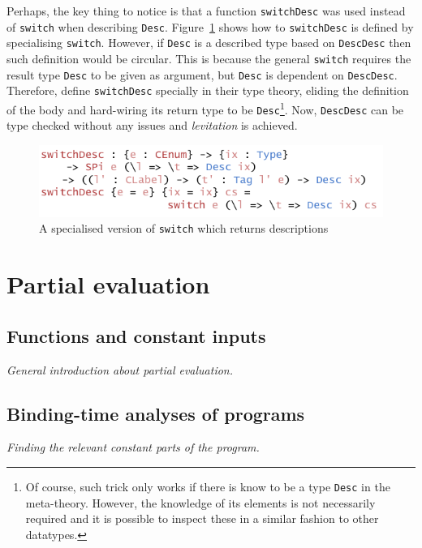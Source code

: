 \documentclass{ituthesis}
\newcommand{\tttype}[1]{\textcolor{type-color}{\texttt{#1}}}
\newcommand{\ttdec}[1]{\textcolor{declared-var-color}{\texttt{#1}}}
\theoremstyle{definition}
\begin{document}
Perhaps, the key thing to notice is that a function \ttdec{switchDesc} was used instead of \ttdec{switch} when describing \tttype{Desc}.
Figure~\ref{fig:switchdesc} shows how to \ttdec{switchDesc} is defined by specialising \ttdec{switch}. However, if \tttype{Desc} is a described type based on \ttdec{DescDesc} then such definition would be circular.
This is because the general \ttdec{switch} requires the result type \tttype{Desc} to be given as argument, but \tttype{Desc} is dependent on \ttdec{DescDesc}. Therefore, \cite{Chapman:2010:GAL:1863543.1863547} define \ttdec{switchDesc} specially in their type theory, eliding the definition of the body
and hard-wiring its return type to be \tttype{Desc}\footnote{Of course, such trick only works if there is know to be a type \tttype{Desc} in the meta-theory. However, the knowledge of its elements is not necessarily required and it is possible to inspect these
in a similar fashion to other datatypes.}. Now, \ttdec{DescDesc} can be type checked without any issues and \textit{levitation} is achieved.

\begin{figure}[ht]
\begin{center}
    \includegraphics[scale=0.5]{Figures/AConstructiveChoiceDesc.png}
\end{center}
\caption{A specialised version of \ttdec{switch} which returns descriptions}
\label{fig:switchdesc}
\end{figure}

\chapter{Partial evaluation}
\label{cha:PartialEvaluation}

\section{Functions and constant inputs}
\label{sec:FunctionsandConstantInputs}
\textit{General introduction about partial evaluation.}

\section{Binding-time analyses of programs}
\label{sec:Binding-timeAnalysisofPrograms}
\textit{Finding the relevant constant parts of the program.}
\end{document}
